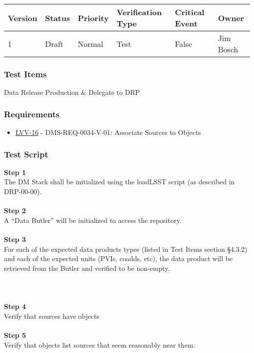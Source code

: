 \begin{longtable}[]{@{}llllll@{}}
\toprule
Version & Status & Priority & Verification Type & Critical Event &
Owner\tabularnewline
\midrule
\endhead
1 & Draft & Normal & Test & False & Jim Bosch\tabularnewline
\bottomrule
\end{longtable}

\hypertarget{test-items-150}{%
\subsubsection{Test Items}\label{test-items-150}}

Data Release Production \& Delegate to DRP

\hypertarget{requirements-151}{%
\subsubsection{Requirements}\label{requirements-151}}

\begin{itemize}
\tightlist
\item
  \href{https://jira.lsstcorp.org/browse/LVV-16}{LVV-16} -
  DMS-REQ-0034-V-01: Associate Sources to Objects
\end{itemize}

\hypertarget{test-script-151}{%
\subsubsection{Test Script}\label{test-script-151}}

\textbf{Step 1}\\
The DM Stack shall be initialized using the loadLSST script (as
described in DRP-00-00).\\
~\\
\textbf{Step 2}\\
A ``Data Butler'' will be initialized to access the repository.\\
~\\
\textbf{Step 3}\\
For each of the expected data products types (listed in Test Items
section §4.3.2) and each of the expected units (PVIs, coadds, etc), the
data product will be retrieved from the Butler and verified to be
non-empty.\\
~\\
~\\
~\\
\textbf{Step 4}\\
Verify that sources have objects\\
~\\
\textbf{Step 5}\\
Verify that objects list sources that seem reasonably near them.\\
~\\

